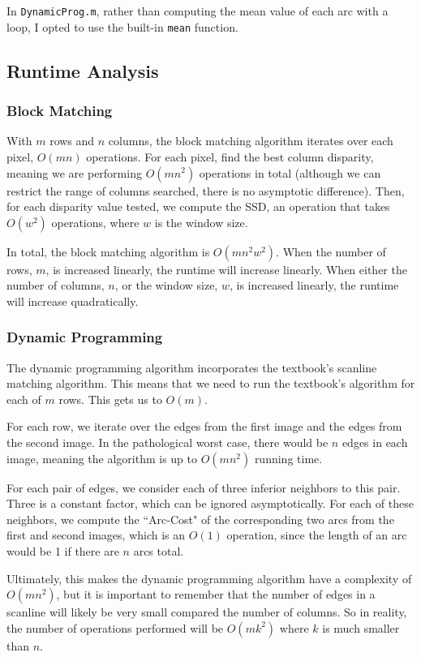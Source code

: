 \documentclass[12pt]{article}
\begin{document}
In \texttt{DynamicProg.m}, rather than computing the mean value of each arc
with a loop, I opted to use the built-in \texttt{mean} function.  

\subsection{Runtime Analysis}

\subsubsection{Block Matching}
With $m$ rows and $n$ columns, the block matching algorithm iterates over each
pixel, $O(mn)$ operations.  For each pixel, find the best column disparity,
meaning we are performing $O(mn^2)$ operations in total (although we can
restrict the range of columns searched, there is no asymptotic difference).
Then, for each disparity value tested, we compute the SSD, an operation that
takes $O(w^2)$ operations, where $w$ is the window size.

In total, the block matching algorithm is $O(mn^2w^2)$. When the number of
rows, $m$, is increased linearly, the runtime will increase linearly. When
either the number of columns, $n$, or the window size, $w$, is increased
linearly, the runtime will increase quadratically.

\subsubsection{Dynamic Programming}

The dynamic programming algorithm incorporates the textbook's scanline matching
algorithm. This means that we need to run the textbook's algorithm for each of
$m$ rows.  This gets us to $O(m)$.

For each row, we iterate over the edges from the first image and the edges from
the second image. In the pathological worst case, there would be $n$ edges in
each image, meaning the algorithm is up to $O(mn^2)$ running time.

For each pair of edges, we consider each of three inferior neighbors to this
pair.  Three is a constant factor, which can be ignored asymptotically.	For
each of these neighbors, we compute the ``Arc-Cost" of the corresponding two
arcs from the first and second images, which is an $O(1)$ operation, since the
length of an arc would be 1 if there are $n$ arcs total.

Ultimately, this makes the dynamic programming algorithm have a complexity of
$O(mn^2)$, but it is important to remember that the number of edges in a
scanline will likely be very small compared the number of columns.  So in
reality, the number of operations performed will be $O(mk^2)$ where $k$ is much
smaller than $n$.
\end{document}
